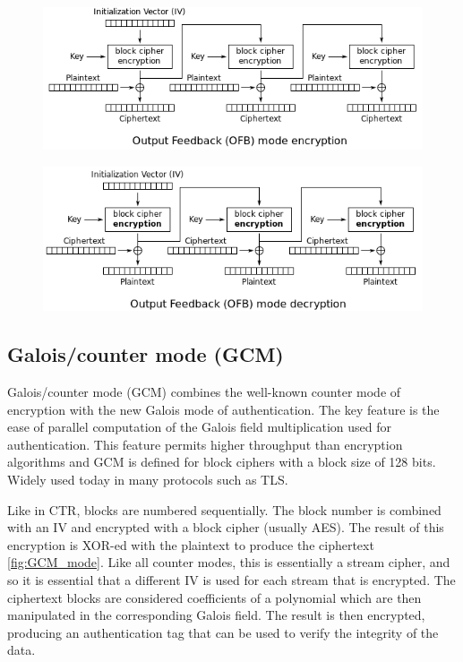 \begin{figure}
	\centering
	\includegraphics[width=0.7\linewidth]{Images/Chapter3/OFB_Encryption}
	\caption{}
	\label{fig:OFB_Encryption}
\end{figure}

\begin{figure}
	\centering
	\includegraphics[width=0.7\linewidth]{Images/Chapter3/OFB_Decryption}
	\caption{}
	\label{fig:OFB_Decryption}
\end{figure}

\subsection{Galois/counter mode (GCM)}

Galois/counter mode (GCM) combines the well-known counter mode of encryption with the new Galois mode of authentication. The key feature is the ease of parallel computation of the Galois field multiplication used for authentication. This feature permits higher throughput than encryption algorithms and GCM is defined for block ciphers with a block size of 128 bits. Widely used today in many protocols such as TLS.

Like in CTR, blocks are numbered sequentially. The block number is combined with an IV and encrypted with a block cipher (usually AES). The result of this encryption is XOR-ed with the plaintext to produce the ciphertext \ref{fig:GCM_mode}. Like all counter modes, this is essentially a stream cipher, and so it is essential that a different IV is used for each stream that is encrypted. The ciphertext blocks are considered coefficients of a polynomial which are then manipulated in the corresponding Galois field. The result is then encrypted, producing an authentication tag that can be used to verify the integrity of the data.

